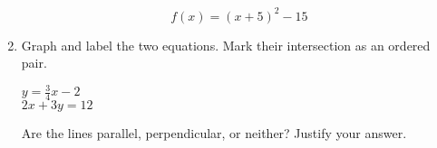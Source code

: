 \documentclass[12pt, twoside]{article}
\begin{document}
\begin{enumerate}
      \[f(x) = (x+5)^2-15\]
  \vspace{3cm}

  \item Graph and label the two equations. Mark their intersection as an ordered pair.
    \begin{multicols}{2}
      $y = \frac{3}{4}x-2$ \\
      $2x+3y = 12$
    \end{multicols}     \vspace{2cm}
    Are the lines parallel, perpendicular, or neither? Justify your answer.
    \vspace{2cm}

    \begin{center} %
    \end{center}

  \end{enumerate}
\end{document}
